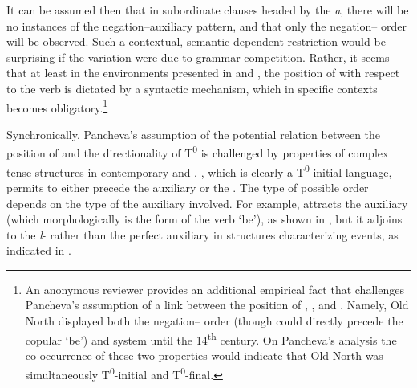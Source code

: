 \documentclass[output=paper,modfonts,newtxmath,hidelinks]{langscibook}
\begin{document}
\noindent It can be assumed then that in subordinate clauses headed by the  \textit{a}, there will be no instances of the negation--auxiliary pattern, and that only the negation-- order will be observed. Such a contextual, semantic-dependent restriction would be surprising if the variation were due to grammar competition. Rather, it seems that at least in the environments presented in  and , the position of  with respect to the verb is dictated by a syntactic mechanism, which in specific contexts becomes obligatory.\footnote{\label{11:fn5}An anonymous reviewer provides an additional empirical fact that challenges Pancheva’s assumption of a link between the position of , , and . Namely, Old North  displayed both the negation-- order (though  could directly precede the copular `be') and   system until the 14\textsuperscript{th} century. On Pancheva’s analysis the co-occurrence of these two properties would indicate that Old North  was simultaneously T\textsuperscript{0}{}-initial and T\textsuperscript{0}{}-final.}  

Synchronically, Pancheva’s assumption of the potential relation between the position of  and the directionality of T\textsuperscript{0} is challenged by properties of complex tense structures in contemporary  and . , which is clearly a T\textsuperscript{0}{}-initial language, permits  to either precede the auxiliary or the . The type of possible order depends on the type of the auxiliary involved. For example,  attracts the  auxiliary (which morphologically is the  form of the verb `be'), as shown in , but it adjoins to the \textit{l}{}- rather than the perfect auxiliary in structures characterizing  events, as indicated in .

\ea \label{11:ex25}
	\label{11:ex25a}
	\label{11:ex25b}
	\z
\z
\end{document}
